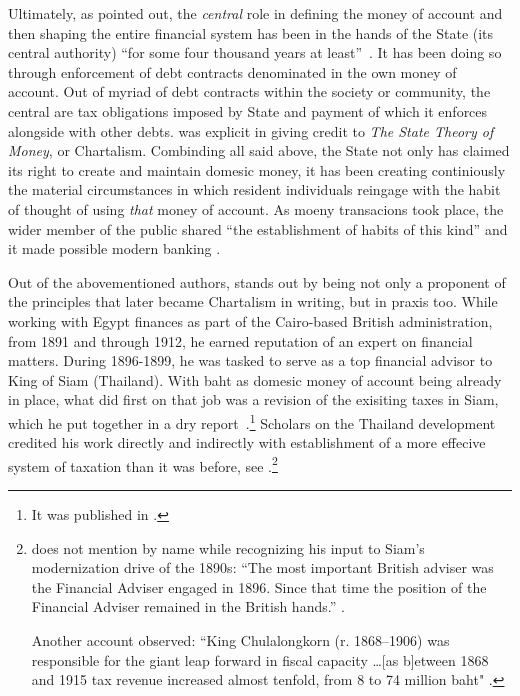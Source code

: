 Ultimately, as \cite{keynes1930a} pointed out, the \textit{central} role in defining the money of account and then shaping the entire financial system has been in the hands of the State (its central authority) ``for some four thousand years at least''~\citep[p.~4]{keynes1930a}. It has been doing so through enforcement of debt contracts denominated in the own money of account. Out of myriad of debt contracts within the society or community, the central are tax obligations imposed by State and payment of which it enforces alongside with other debts. \citeauthor{keynes1930a} was explicit in giving credit to \cite{knapp1905} \textit{The State Theory of Money}, or Chartalism. Combinding all said above, the State not only has claimed its right to create and maintain domesic money, it has been creating continiously the material circumstances in which resident individuals reingage with the habit of thought of using \textit{that} money of account. As moeny transacions took place, the wider member of the public shared ``the establishment of habits of this kind'' and it made possible modern banking \citep[p.~23]{keynes1930a}. 

Out of the abovementioned authors, \citeauthor{innes1913} stands out by being not only a proponent of the principles that later became Chartalism in writing, but in praxis too. While working with Egypt finances as part of the Cairo-based British administration, from 1891 and through 1912, he earned reputation of an expert on financial matters. During 1896-1899, he was tasked to serve as a top financial advisor to King of Siam (Thailand). With baht as domesic money of account being already in place, what \citeauthor{innes1913} did first on that job was a revision of the exisiting taxes in Siam, which he put together in a dry report~\citep[see][]{innes1896}.\footnote{It was published in \cite{siam1978}.} Scholars on the Thailand development credited his work directly and indirectly with establishment of a more effecive system of taxation than it was before, see \citep{vella1955,brown1992,queralt2022}.\footnote{\cite{vella1955} does not mention \citeauthor{innes1913} by name while recognizing his input to Siam's modernization drive of the 1890s: ``The most important British adviser was the Financial Adviser engaged in 1896. Since that time the position of the Financial Adviser remained in the British hands.'' \citep[p.~343]{vella1955}.\par Another account observed: ``King Chulalongkorn (r. 1868--1906) was responsible for the giant leap forward in fiscal capacity \dots [as b]etween 1868 and 1915 tax revenue increased almost tenfold, from 8 to 74 million baht" \citep[p.~263]{queralt2022}.} 

